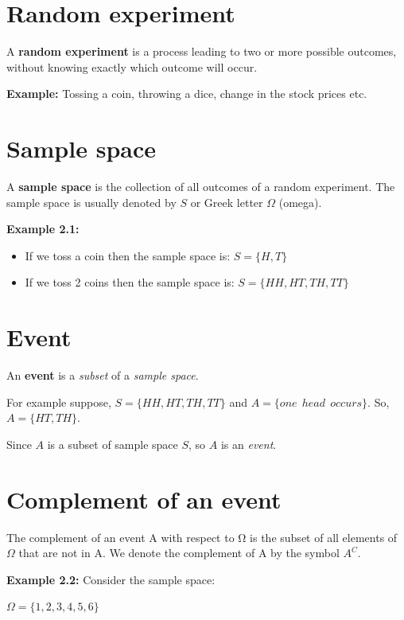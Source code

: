 \documentclass[
  11pt,
  letterpaper,
  DIV=11,
  numbers=noendperiod]{scrreprt}
\begin{document}
\section{Random experiment}\label{random-experiment}

A \textbf{random experiment} is a process leading to two or more
possible outcomes, without knowing exactly which outcome will occur.

\textbf{Example:} Tossing a coin, throwing a dice, change in the stock
prices etc.

\section{Sample space}\label{sample-space}

A \textbf{sample space} is the collection of all outcomes of a random
experiment. The sample space is usually denoted by \(S\) or Greek letter
\(\Omega\) (omega).

\textbf{Example 2.1:}

\begin{itemize}
\item
  If we toss a coin then the sample space is: \(S=\{H,T\}\)
\item
  If we toss 2 coins then the sample space is: \(S=\{HH,HT,TH,TT\}\)
\end{itemize}

\section{Event}\label{event}

An \textbf{event} is a \emph{subset} of a \emph{sample space}.

For example suppose, \(S=\{HH,HT,TH,TT\}\) and
\(A=\{ one \ \ head \ \ occurs  \}\). So, \(A=\{ HT,TH\}\).

Since \(A\) is a subset of sample space \(S\), so \(A\) is an
\emph{event}.

\section{Complement of an event}\label{complement-of-an-event}

The complement of an event A with respect to Ω is the subset of all
elements of \(\Omega\) that are not in A. We denote the complement of A
by the symbol \(A^C\).

\textbf{Example 2.2:} Consider the sample space:

\(\Omega =\{ 1,2,3,4,5,6\}\)
\end{document}

